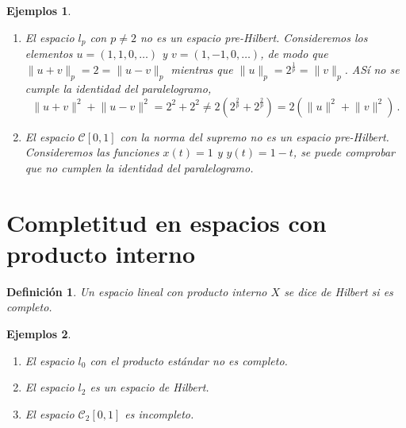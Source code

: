 \documentclass[12pt]{book}
\newtheorem{defn}{\bf Definición}[chapter]
\newtheorem{listaejemplos}{\bf Ejemplos}[chapter]
\def\beginejems{\begin{listaejemplos}\quad\begin{enumerate}}
\def\endejems{\end{enumerate}\end{listaejemplos}}
\newcommand{\norm}[1]{\lVert #1\rVert }
\begin{document}
\beginejems
\item  El espacio $l_p$  con $p\not=2$ no es un espacio pre-Hilbert. Consideremos los  elementos $u=(1,1,0,\dots)$ y $v=(1,-1,0,\dots)$, de modo que $\norm{u+v}_p=2=\norm{u-v}_p$ mientras que $\norm{u}_p=2^{\frac{1}{p}}=\norm{v}_p$. ASí no se cumple la identidad del paralelogramo,
$$\norm{u+v}^2+\norm{u-v}^2=2^2+2^2\not= 2(2^{\frac{2}{p}}+2^{\frac{2}{p}})=2(\norm{u}^2+\norm{v}^2)\,.$$
\item El espacio $\mathcal{C}[0,1]$ con la norma del supremo no es un espacio pre-Hilbert. Consideremos las funciones $x(t)=1$ y $y(t)=1-t$, se puede comprobar que no cumplen la identidad del paralelogramo.
\endejems
\section{Completitud en espacios con producto interno}
\begin{defn} Un  espacio lineal con producto interno $X$  se dice de {\emph Hilbert}  si es   completo.
\end{defn}
\beginejems
\item El espacio $l_0$ con el producto estándar no es completo.
\item El espacio $l_2$ es un espacio de Hilbert.
\item El espacio $\mathcal{C_2}[0,1]$  es incompleto.
\endejems
\end{document}

